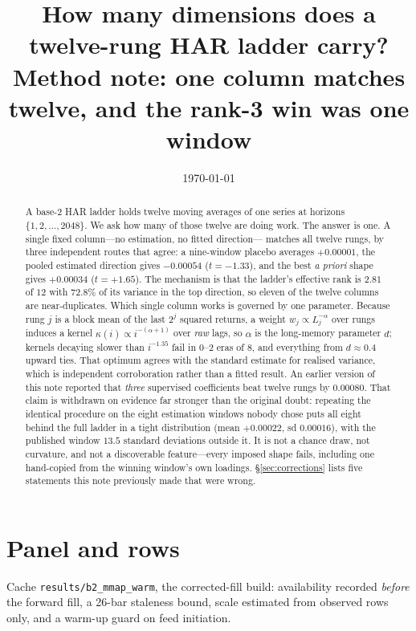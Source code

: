 \documentclass[11pt,a4paper]{article}
\title{How many dimensions does a twelve-rung HAR ladder carry?\\
       \large Method note: one column matches twelve, and the rank-3 win was
       one window}
\author{}
\date{\today}
\begin{document}
\maketitle

\begin{abstract}
\noindent
A base-2 HAR ladder holds twelve moving averages of one series at horizons
$\{1,2,\dots,2048\}$. We ask how many of those twelve are doing work. The
answer is one. A single fixed column---no estimation, no fitted direction---
matches all twelve rungs, by three independent routes that agree: a
nine-window placebo averages $+0.00001$, the pooled estimated direction gives
$-0.00054$ ($t=-1.33$), and the best \emph{a priori} shape gives $+0.00034$
($t=+1.65$). The mechanism is that the ladder's effective rank is $2.81$ of
$12$ with $72.8\%$ of its variance in the top direction, so eleven of the
twelve columns are near-duplicates. Which single column works is governed by
one parameter. Because rung $j$ is a block mean of the last $2^j$ squared
returns, a weight $w_j \propto L_j^{-\alpha}$ over rungs induces a kernel
$\kappa(i) \propto i^{-(\alpha+1)}$ over \emph{raw} lags, so $\alpha$ is the
long-memory parameter $d$; kernels decaying slower than $i^{-1.35}$ fail in
$0$--$2$ eras of $8$, and everything from $d \approx 0.4$ upward ties. That
optimum agrees with the standard estimate for realised variance, which is
independent corroboration rather than a fitted result. An earlier version of
this note reported that \emph{three} supervised coefficients beat twelve rungs
by $0.00080$. That claim is withdrawn on evidence far stronger than the
original doubt: repeating the identical procedure on the eight estimation
windows nobody chose puts all eight behind the full ladder in a tight
distribution (mean $+0.00022$, sd $0.00016$), with the published window
$13.5$ standard deviations outside it. It is not a chance draw, not curvature,
and not a discoverable feature---every imposed shape fails, including one
hand-copied from the winning window's own loadings. \S\ref{sec:corrections}
lists five statements this note previously made that were wrong.
\end{abstract}

\section{Panel and rows}

Cache \texttt{results/b2\_mmap\_warm}, the corrected-fill build: availability
recorded \emph{before} the forward fill, a 26-bar staleness bound, scale
estimated from observed rows only, and a warm-up guard on feed initiation.
\end{document}
